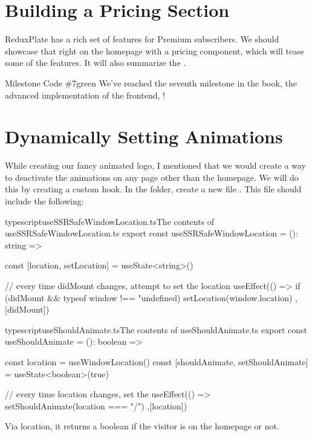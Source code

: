 \documentclass[a4paper,headinclude=on,footinclude=on,12pt,oneside]{scrbook}
\begin{document}
\section{Building a Pricing Section}

ReduxPlate has a rich set of features for Premium subscribers. We should showcase that right on the homepage with a pricing component, which will tease some of the features. It will also summarize the .

\begin{highlightBox}{Milestone Code \#7}{green}{\greenCheck}
We've reached the seventh milestone in the book, the advanced implementation of the frontend, !
\end{highlightBox}

\section{Dynamically Setting Animations}

While creating our fancy animated logo, I mentioned that we would create a way to deactivate the animations on any page other than the homepage. We will do this by creating a custom hook. In the  folder, create a new file . This file should include the following:

\begin{codeInput}{typescript}{useSSRSafeWindowLocation.ts}{The contents of useSSRSafeWindowLocation.ts}
export const useSSRSafeWindowLocation = (): string => {
  const [location, setLocation] = useState<string>()

  // every time didMount changes, attempt to set the location
  useEffect(() => {
    if (didMount && typeof window !== "undefined) {
      setLocation(window.location)
    }
  },[didMount])
}
\end{codeInput}

\begin{codeInput}{typescript}{useShouldAnimate.ts}{The contents of useShouldAnimate.ts}
export const useShouldAnimate = (): boolean => {
  const location = useWindowLocation()
  const [shouldAnimate, setShouldAnimate] = useState<boolean>(true)

  // every time location changes, set the
  useEffect(() => {
    setShouldAnimate(location === "/") 
  },[location])
}
\end{codeInput}

Via location, it returns a boolean if the visitor is on the homepage or not.
\end{document}
